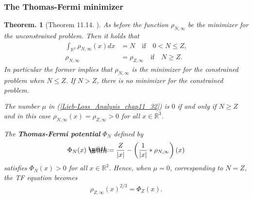 \documentclass[openany, a4paper, oneside]{jsbook}
\makeatletter
\newcommand*{\defeq}{\mathrel{\rlap{%
\raisebox{0.3ex}{$\m@th\cdot$}}%
\raisebox{-0.3ex}{$\m@th\cdot$}}%
=}
\theoremstyle{break}
\newtheorem{thm}{Theorem.}[section]
\theoremstyle{breakdefn}
\newcommand{\abs}[1]{\left|#1\right|}
\newcommand{\rbk}[1]{\left (#1\right)}
\newcommand{\bbRthree}{\mathbb{R}^3}
\newcommand{\rhoNinfty}{\rho_{N, \infty}}
\newcommand{\upbf}[1]{\textup{\textbf{#1}}}
\makeatother
\begin{document}
\subsubsection{The Thomas-Fermi minimizer \label{Lieb-Loss_Analysis_chap11_39}}


\begin{thm}[Theorem 11.14. \cite{LiebLoss1}]
 As before the function $\rhoNinfty$ be the minimizer for the unconstrained problem.
 Then it holds that
 \begin{align}
  \int_{\bbRthree} \rhoNinfty (x) dx
  &=
  N \quad \mathrm{if} \quad 0 < N \leq Z, \\
  \rhoNinfty
  &=
  \rho_{Z, \infty} \quad \mathrm{if} \quad N \geq Z.
 \end{align}
 In particular the former implies that $\rhoNinfty$ is the minimizer for the constrained problem when $N \leq Z$.
 If $N > Z$, there is no minimizer for the constrained problem.

 The number $\mu$ in \textup{(\ref{Lieb-Loss_Analysis_chap11_32})} is $0$ if and only if $N \geq Z$ and in this case
 $\rhoNinfty (x) = \rho_{Z, \infty} > 0$ for all $x \in \bbRthree$.

 The \upbf{Thomas-Fermi potential} $\Phi_N$ defined by
 \begin{align}
  \Phi_N (x)
  \defeq
  \frac{Z}{\abs{x}} - \rbk{\frac{1}{\abs{x}} * \rhoNinfty} (x)
 \end{align}
 satisfies $\Phi_N (x) > 0$ for all $x \in \bbRthree$.
 Hence, when $\mu = 0$, corresponding to $N = Z$, the TF equation becomes
 \begin{align}
  \rho_{Z, \infty} (x)^{2/3}
  =
  \Phi_Z (x). \label{Lieb-Loss_Analysis_chap11_35}
 \end{align}
\end{thm}
\end{document}
